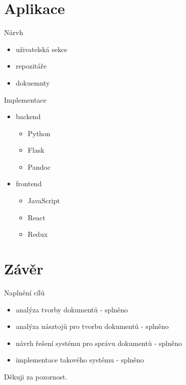 \documentclass[czech,aspectratio=169]{beamer}
\begin{document}
\section{Aplikace}
    \begin{frame}
        \tableofcontents[currentsection]
    \end{frame}
    \begin{frame}{Nárvh}
        \begin{itemize}
            \item uživatelská sekce \pause{}
            \item repozitáře \pause{}
            \item dokuemnty
        \end{itemize}
    \end{frame}
    \begin{frame}{Implementace}
        \begin{itemize}
            \item backend \pause{}
            \begin{itemize}
                \item Python
                \item Flask
                \item Pandoc
            \end{itemize}
            \item frontend \pause{}
            \begin{itemize}
                \item JavaScript
                \item React
                \item Redux
            \end{itemize}
        \end{itemize}
    \end{frame}

\section{Závěr}
    \begin{frame}
        \tableofcontents[currentsection]
    \end{frame}
    \begin{frame}{Naplnění cílů}
        \begin{itemize}
            \item analýza tvorby dokumentů \pause{} - splněno
            \item analýza násztojů pro tvorbu dokumentů \pause{} - splněno
            \item návrh řešení systému pro správu dokumentů \pause{} - splněno
            \item implementace takového systému \pause{} - splněno
        \end{itemize}
        \vfill{Děkuji za pozornost.}
    \end{frame}
\end{document}

